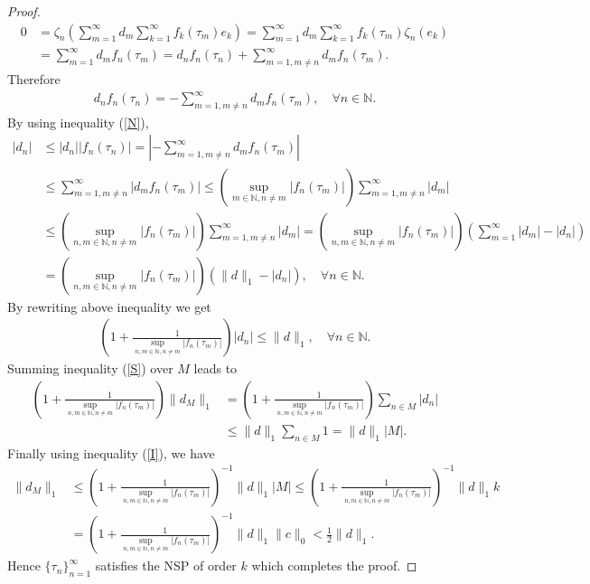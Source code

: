 \documentclass{amsart}
\begin{document}
\begin{proof}
	 \begin{align*}
0&=\zeta_n\left(\sum_{m=1}^{\infty}d_m\sum_{k=1}^{\infty}f_k(\tau_m)e_k\right)=\sum_{m=1}^{\infty}d_m\sum_{k=1}^{\infty}f_k(\tau_m)\zeta_n(e_k)\\
&=\sum_{m=1}^{\infty}d_mf_n(\tau_m)=d_nf_n(\tau_n)+\sum_{m=1, m\neq n}^{\infty}d_mf_n(\tau_m).
\end{align*}
Therefore 
\begin{align*}
d_nf_n(\tau_n)=-\sum_{m=1, m\neq n}^{\infty}d_mf_n(\tau_m), \quad \forall n \in \mathbb{N}.	
\end{align*}
By using inequality (\ref{N}), 
\begin{align*}
	|d_n|&\leq |d_n||f_n(\tau_n)|=\left|-\sum_{m=1, m\neq n}^{\infty}d_mf_n(\tau_m)\right|\\
	&\leq \sum_{m=1, m\neq n}^{\infty}|d_mf_n(\tau_m)|\leq \left(\displaystyle\sup_{m \in \mathbb{N}, n \neq m}|f_n(\tau_m)|\right)\sum_{m=1, m\neq n}^{\infty}|d_m|\\
	&\leq  \left(\displaystyle\sup_{n, m \in \mathbb{N}, n \neq m}|f_n(\tau_m)|\right)\sum_{m=1, m\neq n}^{\infty}|d_m|=\left(\displaystyle\sup_{n, m \in \mathbb{N}, n \neq m}|f_n(\tau_m)|\right)\left(\sum_{m=1}^{\infty}|d_m|-|d_n|\right)\\
	&=\left(\displaystyle\sup_{n, m \in \mathbb{N}, n \neq m}|f_n(\tau_m)|\right)(\|d\|_1-|d_n|), \quad \forall n \in \mathbb{N}.
\end{align*}
By rewriting above inequality  we get
\begin{align}\label{S}
	\left(1+\frac{1}{\displaystyle\sup_{n, m \in \mathbb{N}, n \neq m}| f_n(\tau_m)|}\right)|d_n|\leq \|d\|_1, \quad \forall n \in \mathbb{N}.
\end{align}
Summing inequality (\ref{S}) over $M$ leads to 
\begin{align*}
	\left(1+\frac{1}{\displaystyle\sup_{n, m \in \mathbb{N}, n \neq m}| f_n(\tau_m)|}\right)\|d_M\|_1&=\left(1+\frac{1}{\displaystyle\sup_{n, m \in \mathbb{N}, n \neq m}| f_n(\tau_m)|}\right)\sum_{n\in M}|d_n|\\
	&\leq \|d\|_1	\sum_{n\in M} 1= \|d\|_1|M|.
\end{align*}
Finally using inequality (\ref{I}), we have 
\begin{align*}
\|d_M\|_1&\leq \left(1+\frac{1}{\displaystyle\sup_{n, m \in \mathbb{N}, n \neq m}| f_n(\tau_m)|}\right)^{-1} \|d\|_1|M|\leq\left(1+\frac{1}{\displaystyle\sup_{n, m \in \mathbb{N}, n \neq m}| f_n(\tau_m)|}\right)^{-1} \|d\|_1k\\
&=\left(1+\frac{1}{\displaystyle\sup_{n, m \in \mathbb{N}, n \neq m}| f_n(\tau_m)|}\right)^{-1} \|d\|_1\|c\|_0<\frac{1}{2}\|d\|_1.
\end{align*}
Hence 	$\{\tau_n \}_{n=1}^\infty$ satisfies the  NSP of order $k$ which completes the proof.
\end{proof}
\end{document}
